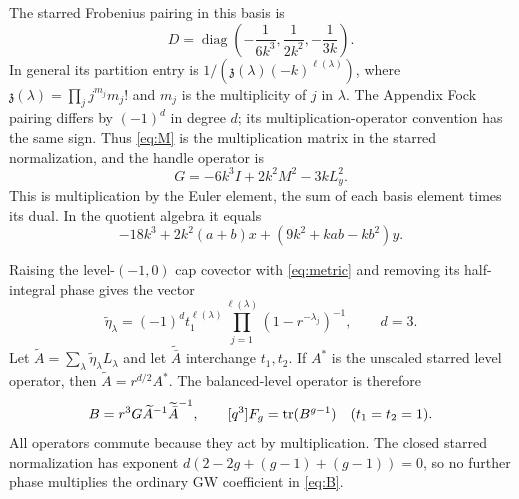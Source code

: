 The starred Frobenius pairing in this basis is
\begin{equation}\label{eq:metric}
 D=\operatorname{diag}\left(-\frac1{6k^3},\frac1{2k^2},-\frac1{3k}\right).
\end{equation}
In general its partition entry is
$1/(\mathfrak z(\lambda)(-k)^{\ell(\lambda)})$, where
$\mathfrak z(\lambda)=\prod_j j^{m_j}m_j!$ and $m_j$ is the
multiplicity of $j$ in $\lambda$. The Appendix Fock pairing differs
by $(-1)^d$ in degree $d$; its multiplication-operator convention
has the same sign. Thus \eqref{eq:M} is the multiplication matrix
in the starred normalization,
and the handle operator is
\begin{equation}\label{eq:handle}
 G=-6k^3I+2k^2M^2-3kL_y^2.
\end{equation}
This is multiplication by the Euler element, the sum of each basis
element times its dual. In the quotient algebra it equals
\[
 -18k^3+2k^2(a+b)x+(9k^2+kab-kb^2)y.
\]

Raising the level-$(-1,0)$ cap covector with \eqref{eq:metric}
and removing its half-integral phase gives the vector
\begin{equation}\label{eq:cap}
 \widetilde\eta_\lambda
 =(-1)^d t_1^{\ell(\lambda)}
   \prod_{j=1}^{\ell(\lambda)}(1-r^{-\lambda_j})^{-1},
 \qquad d=3.
\end{equation}
Let $\widetilde A=\sum_\lambda\widetilde\eta_\lambda L_\lambda$
and let $\widetilde{\bar A}$ interchange $t_1,t_2$. If $A^*$ is
the unscaled starred level operator, then
$\widetilde A=r^{d/2}A^*$. The balanced-level operator is therefore
\begin{equation}\label{eq:B}
 B=r^3G\widetilde A^{-1}\widetilde{\bar A}^{-1},\qquad
 [q^3]F_g=\operatorname{tr}(B^{g-1})\quad(t_1=t_2=1).
\end{equation}
All operators commute because they act by multiplication.
The closed starred normalization has exponent
$d(2-2g+(g-1)+(g-1))=0$, so no further phase multiplies the
ordinary GW coefficient in \eqref{eq:B}.

